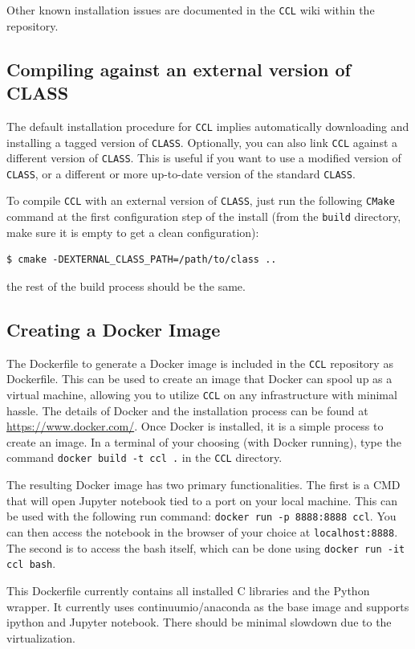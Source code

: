 \documentclass[\docopts]{\docclass}
\newcommand{\ccl}{{\tt CCL}\xspace}
\begin{document}
Other known installation issues are documented in the \ccl wiki within the repository.

\subsection{Compiling against an external version of CLASS}
\label{sec:extclass}

The default installation procedure for \ccl implies automatically downloading and installing a tagged version of {\tt CLASS}. Optionally, you can also link \ccl against a different version of {\tt CLASS}. This is useful if you want to use a modified version of {\tt CLASS}, or a different or more up-to-date version of the standard {\tt CLASS}.

To compile \ccl with an external version of {\tt CLASS}, just run the following {\tt CMake} command at the first configuration step of the install (from the {\tt build} directory, make sure it is empty to get a clean configuration):
\begin{verbatim}
$ cmake -DEXTERNAL_CLASS_PATH=/path/to/class ..
\end{verbatim}
the rest of the build process should be the same.


\subsection{Creating a Docker Image}

The Dockerfile to generate a Docker image is included in the \ccl repository as Dockerfile. This can be used to create an image that Docker can spool up as a virtual machine, allowing you to utilize \ccl on any infrastructure with minimal hassle. The details of Docker and the installation process can be found at \url{https://www.docker.com/}. Once Docker is installed, it is a simple process to create an image. In a terminal of your choosing (with Docker running), type the command {\tt docker build -t ccl .} in the \ccl directory.

The resulting Docker image has two primary functionalities. The first is a CMD that will open Jupyter notebook tied to a port on your local machine. This can be used with the following run command: {\tt docker run -p 8888:8888 ccl}. You can then access the notebook in the browser of your choice at {\tt localhost:8888}. The second is to access the bash itself, which can be done using {\tt docker run -it ccl bash}.

This Dockerfile currently contains all installed C libraries and the Python wrapper. It currently uses continuumio/anaconda as the base image and supports ipython and Jupyter notebook. There should be minimal slowdown due to the virtualization.
\end{document}
